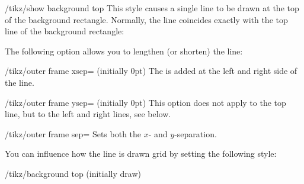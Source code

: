 \begin{stylekey}{/tikz/show background top}
    This style causes a single line to be drawn at the top of the background
    rectangle. Normally, the line coincides exactly with the top line of the
    background rectangle:
\begin{codeexample}[preamble={\usetikzlibrary{backgrounds}}]
\end{codeexample}
    The following option allows you to lengthen (or shorten) the line:
    \begin{key}{/tikz/outer frame xsep= (initially 0pt)}
        The  is added at the left and right side of the line.
\begin{codeexample}[preamble={\usetikzlibrary{backgrounds}}]
\end{codeexample}
    \end{key}
    \begin{key}{/tikz/outer frame ysep= (initially 0pt)}
        This option does not apply to the top line, but to the left and right
        lines, see below.
    \end{key}
    \begin{key}{/tikz/outer frame sep=}
        Sets both the $x$- and $y$-separation.
    \end{key}
\begin{codeexample}[preamble={\usetikzlibrary{backgrounds}}]
\end{codeexample}
    You can influence how the line is drawn grid by setting the following
    style:
    \begin{stylekey}{/tikz/background top (initially draw)}
\begin{codeexample}[preamble={\usetikzlibrary{backgrounds}}]
\end{codeexample}
    \end{stylekey}
\end{stylekey}

